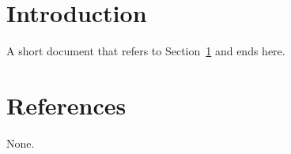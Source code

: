 \documentclass[a4paper]{article}
\begin{document}
\section{Introduction}\label{sec:intro}
A short document that refers to Section~\ref{sec:intro} and ends here.
\section{References}
None.
\end{document}
